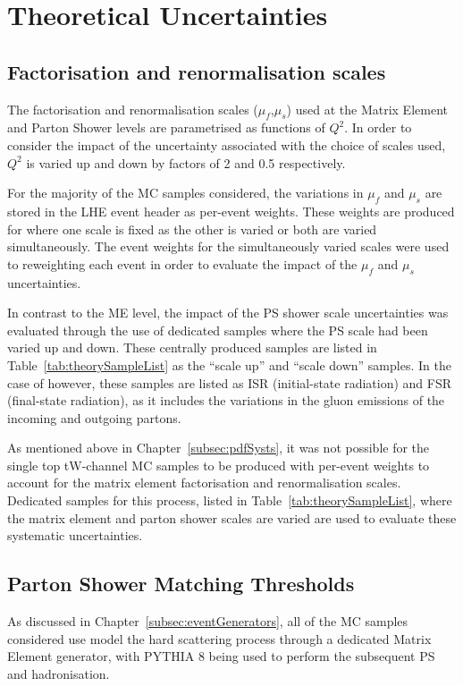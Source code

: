 \section{Theoretical Uncertainties}\label{sec:theorySysts}

\subsection{Factorisation and renormalisation scales}
The factorisation and renormalisation scales ($\mu_{f}$,$\mu_{s}$) used at the Matrix Element and Parton Shower levels are parametrised as functions of $Q^{2}$.
In order to consider the impact of the uncertainty associated with the choice of scales used, $Q^{2}$ is varied up and down by factors of 2 and 0.5 respectively.

For the majority of the MC samples considered, the variations in $\mu_{f}$ and $\mu_{s}$ are stored in the LHE event header as per-event weights.
These weights are produced for where one scale is fixed as the other is varied or both are varied simultaneously.
The event weights for the simultaneously varied scales were used to reweighting each event in order to evaluate the impact of the $\mu_{f}$ and $\mu_{s}$ uncertainties.

In contrast to the ME level, the impact of the PS shower scale uncertainties was evaluated through the use of dedicated samples where the PS scale had been varied up and down.
These centrally produced samples are listed in Table~\ref{tab:theorySampleList} as the ``scale up'' and ``scale down'' samples.
In the case of \ttbar however, these samples are listed as ISR (initial-state radiation) and FSR (final-state radiation), as it includes the variations in the gluon emissions of the incoming and outgoing partons.

As mentioned above in Chapter~\ref{subsec:pdfSysts}, it was not possible for the single top tW-channel MC samples to be produced with per-event weights to account for the matrix element factorisation and renormalisation scales.
Dedicated samples for this process, listed in Table~\ref{tab:theorySampleList}, where the matrix element and parton shower scales are varied are used to evaluate these systematic uncertainties.

\subsection{Parton Shower Matching Thresholds}
As discussed in Chapter~\ref{subsec:eventGenerators}, all of the MC samples considered use model the hard scattering process through a dedicated Matrix Element generator, with PYTHIA 8 being used to perform the subsequent PS and hadronisation.

